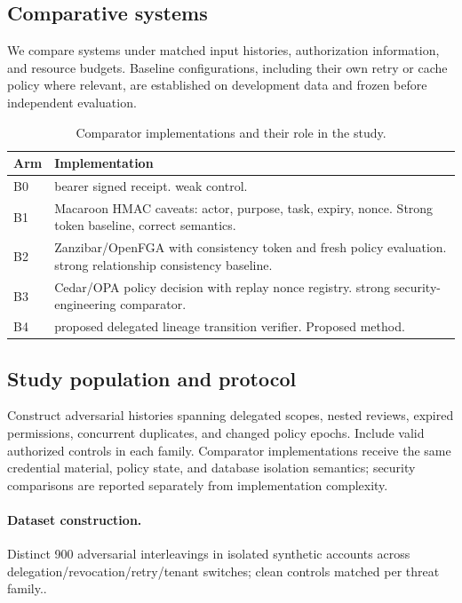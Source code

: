 \documentclass[11pt,a4paper]{article}
\begin{document}
\subsection{Comparative systems}
We compare systems under matched input histories, authorization information, and resource budgets. Baseline configurations, including their own retry or cache policy where relevant, are established on development data and frozen before independent evaluation.
\begin{table}[ht]
\centering\footnotesize
\caption{Comparator implementations and their role in the study.}
\begin{tabularx}{\linewidth}{@{}lX@{}}\toprule
Arm & Implementation \\ \midrule
B0 & bearer signed receipt. weak control. \\ 
B1 & Macaroon HMAC caveats: actor, purpose, task, expiry, nonce. Strong token baseline, correct semantics. \\ 
B2 & Zanzibar/OpenFGA with consistency token and fresh policy evaluation. strong relationship consistency baseline. \\ 
B3 & Cedar/OPA policy decision with replay nonce registry. strong security-engineering comparator. \\ 
B4 & proposed delegated lineage transition verifier. Proposed method. \\ 
\bottomrule\end{tabularx}
\end{table}

\subsection{Study population and protocol}
Construct adversarial histories spanning delegated scopes, nested reviews, expired permissions, concurrent duplicates, and changed policy epochs. Include valid authorized controls in each family. Comparator implementations receive the same credential material, policy state, and database isolation semantics; security comparisons are reported separately from implementation complexity.

\paragraph{Dataset construction.} Distinct 900 adversarial interleavings in isolated synthetic accounts across delegation/revocation/retry/tenant switches; clean controls matched per threat family..
\end{document}
